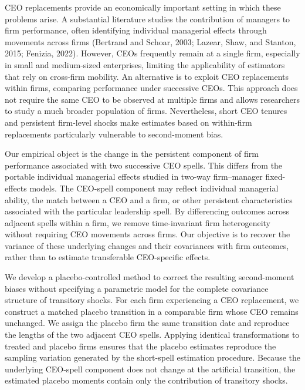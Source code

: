 \documentclass[sigconf,nonacm]{acmart}
\begin{document}
CEO replacements provide an economically important setting in which
these problems arise. A substantial literature studies the contribution
of managers to firm performance, often identifying individual managerial
effects through movements across firms (Bertrand and Schoar, 2003;
Lazear, Shaw, and Stanton, 2015; Fenizia, 2022). However, CEOs frequently
remain at a single firm, especially in small and medium-sized enterprises,
limiting the applicability of estimators that rely on cross-firm mobility.
An alternative is to exploit CEO replacements within firms, comparing
performance under successive CEOs. This approach does not require the same
CEO to be observed at multiple firms and allows researchers to study a
much broader population of firms. Nevertheless, short CEO tenures and
persistent firm-level shocks make estimates based on within-firm
replacements particularly vulnerable to second-moment bias.

Our empirical object is the change in the persistent component of firm
performance associated with two successive CEO spells. This differs from
the portable individual managerial effects studied in two-way
firm--manager fixed-effects models. The CEO-spell component may reflect
individual managerial ability, the match between a CEO and a firm, or
other persistent characteristics associated with the particular
leadership spell. By differencing outcomes across adjacent spells within
a firm, we remove time-invariant firm heterogeneity without requiring CEO
movements across firms. Our objective is to recover the variance of these
underlying changes and their covariances with firm outcomes, rather than
to estimate transferable CEO-specific effects.

We develop a placebo-controlled method to correct the resulting
second-moment biases without specifying a parametric model for the
complete covariance structure of transitory shocks. For each firm
experiencing a CEO replacement, we construct a matched placebo transition
in a comparable firm whose CEO remains unchanged. We assign the placebo
firm the same transition date and reproduce the lengths of the two
adjacent CEO spells. Applying identical transformations to treated and
placebo firms ensures that the placebo estimates reproduce the sampling
variation generated by the short-spell estimation procedure. Because the
underlying CEO-spell component does not change at the artificial
transition, the estimated placebo moments contain only the contribution
of transitory shocks.
\end{document}
